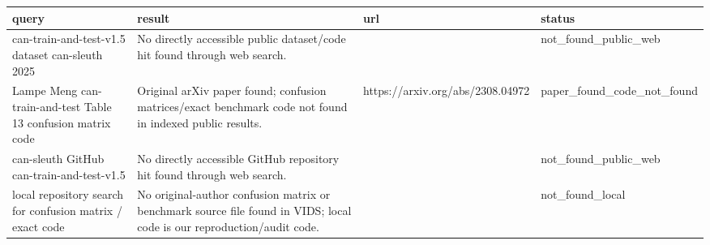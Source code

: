 \begin{tabular}{llll}
\toprule
query & result & url & status \\
\midrule
can-train-and-test-v1.5 dataset can-sleuth 2025 & No directly accessible public dataset/code hit found through web search. &  & not\_found\_public\_web \\
Lampe Meng can-train-and-test Table 13 confusion matrix code & Original arXiv paper found; confusion matrices/exact benchmark code not found in indexed public results. & https://arxiv.org/abs/2308.04972 & paper\_found\_code\_not\_found \\
can-sleuth GitHub can-train-and-test-v1.5 & No directly accessible GitHub repository hit found through web search. &  & not\_found\_public\_web \\
local repository search for confusion matrix / exact code & No original-author confusion matrix or benchmark source file found in VIDS; local code is our reproduction/audit code. &  & not\_found\_local \\
\bottomrule
\end{tabular}

